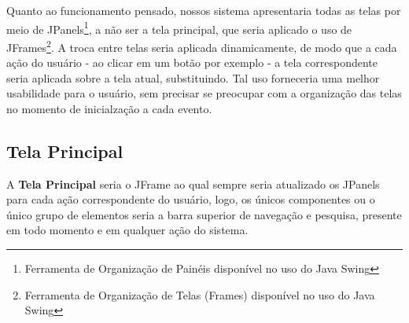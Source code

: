 \documentclass[a4paper,12pt]{article}
\begin{document}
Quanto ao funcionamento pensado, nossos sistema apresentaria todas as telas por meio de JPanels\footnote{
	Ferramenta de Organização de Painéis disponível no uso do Java Swing
}, a não ser a tela principal, que seria aplicado o uso de JFrames\footnote{
	Ferramenta de Organização de Telas (Frames) disponível no uso do Java Swing
}. A troca entre telas seria aplicada dinamicamente, de modo que a cada ação do usuário - ao clicar em um botão por exemplo - a 
tela correspondente seria aplicada sobre a tela atual, substituindo. Tal uso forneceria uma melhor usabilidade para o usuário, 
sem precisar se preocupar com a organização das telas no momento de inicialzação a cada evento.

\subsection{Tela Principal}
A \textbf{Tela Principal} seria o JFrame ao qual sempre seria atualizado os JPanels para cada ação correspondente do usuário, logo, 
os únicos componentes ou o único grupo de elementos seria a barra superior de navegação e pesquisa, presente em todo momento e em 
qualquer ação do sistema.
\end{document}
